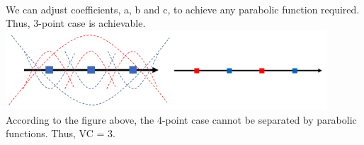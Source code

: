 \\We can adjust coefficients, a, b and c, to achieve any parabolic function required. Thus, 3-point case is achievable. \\\includegraphics[width = 0.9\textwidth]{fig1.png}\\
According to the figure above, the 4-point case cannot be separated by parabolic functions. Thus, VC = 3.